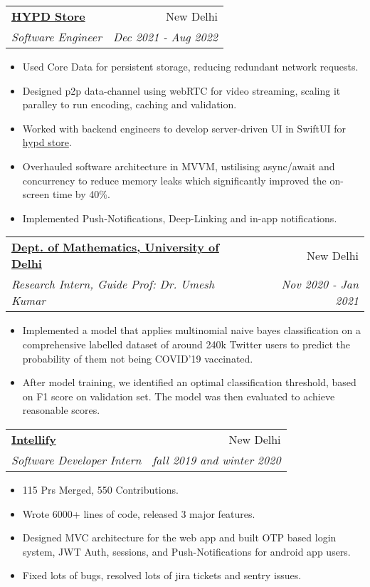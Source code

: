 \documentclass[letterpaper,11pt]{article}
\makeatletter
\newcommand{\resumeItem}[1]{
  \item\small{
    {#1 \vspace{-2pt}}
  }
}
\newcommand{\resumeSubheading}[4]{
  \vspace{-1pt}\item
    \begin{tabular*}{0.97\textwidth}[t]{l@{\extracolsep{\fill}}r}
      \textbf{#1} & #2 \\
      \textit{\small#3} & \textit{\small #4} \\
    \end{tabular*}\vspace{-5pt}
}
\newcommand{\resumeItemListStart}{\begin{itemize}}
\newcommand{\resumeItemListEnd}{\end{itemize}\vspace{-5pt}}
\makeatother
\begin{document}
    \resumeSubheading
    {\href{https://www.hypd.store}{HYPD Store}}{New Delhi}
      {Software Engineer}{Dec 2021 - Aug 2022}
      \resumeItemListStart
        \resumeItem{Used Core Data for persistent storage, reducing redundant network requests.}
        \resumeItem{Designed p2p data-channel using webRTC for video streaming, scaling it paralley to run encoding, caching and validation.}
        \resumeItem{Worked with backend engineers to develop server-driven UI in SwiftUI for \href{https://apps.apple.com/in/app/hypd/id1560284106}{hypd store}.}
        \resumeItem{Overhauled software architecture in MVVM, ustilising async/await and concurrency to reduce memory leaks which significantly improved the on-screen time by 40\%.}
        \resumeItem{Implemented Push-Notifications, Deep-Linking and in-app notifications.}
      \resumeItemListEnd
      


\resumeSubheading
{\href{https://www.du.ac.in}{Dept. of Mathematics, University of Delhi}}{New Delhi}
  {Research Intern, Guide Prof: Dr. Umesh Kumar}{Nov 2020 - Jan 2021}
  \resumeItemListStart
    \resumeItem{Implemented a model that applies multinomial naive bayes classification on a comprehensive labelled dataset of around 240k Twitter users to predict the probability of them not being COVID’19 vaccinated.}
    \resumeItem{After model training, we identified an optimal classification threshold, based on F1 score on validation set. The model was then evaluated to achieve reasonable scores.}
  \resumeItemListEnd

    \resumeSubheading
    {\href{https://www.linkedin.com/company/solveclassesapp/}{Intellify}}{New Delhi}
      {Software Developer Intern}{fall 2019 and winter 2020}
      \resumeItemListStart
        \resumeItem{115 Prs Merged, 550 Contributions.}
        \resumeItem{Wrote 6000+ lines of code, released 3 major features.}
        \resumeItem{Designed MVC architecture for the web app and built OTP based login system, JWT Auth, sessions, and Push-Notifications for android app users.}
        \resumeItem{Fixed lots of bugs, resolved lots of jira tickets and sentry issues.}
      \resumeItemListEnd

\end{document}
